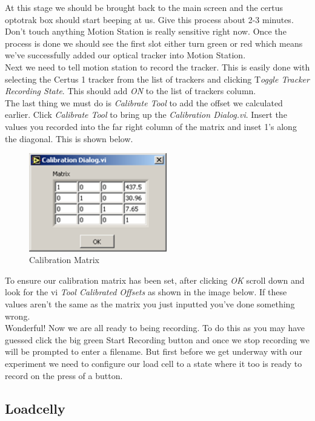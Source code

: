 \documentclass[pdftex,11pt,letterpaper]{article}
\begin{document}
At this stage we should be brought back to the main screen and the certus optotrak box should start beeping at us. Give this process about 2-3 minutes. Don’t touch anything Motion Station is really sensitive right now. Once the process is done we should see the first slot either turn green or red which means we’ve successfully added our optical tracker into Motion Station. \\

Next we need to tell motion station to record the tracker. This is easily done with selecting the Certus 1 tracker from the list of trackers and clicking T\textit{oggle Tracker Recording State}. This should add \textit{ON} to the list of trackers column. \\

The last thing we must do is \textit{Calibrate Tool} to add the offset we calculated earlier. Click \textit{Calibrate Tool} to bring up the \textit{Calibration Dialog.vi}. Insert the values you recorded into the far right column of the matrix and inset 1’s along the diagonal. This is shown below.

\begin{figure}[ht!]
\centering
\includegraphics[width=60mm]{./images/cal_mat}
\caption{Calibration Matrix}
\end{figure}

To ensure our calibration matrix has been set, after clicking \textit{OK} scroll down and look for the vi \textit{Tool Calibrated Offsets} as shown in the image below. If these values aren’t the same as the matrix you just inputted you’ve done something wrong. \\

Wonderful! Now we are all ready to being recording. To do this as you may have guessed click the big green Start Recording button and once we stop recording we will be prompted to enter a filename. But first before we get underway with our experiment we need to configure our load cell to a state where it too is ready to record on the press of a button. 

\subsection{Loadcelly}
\end{document}
